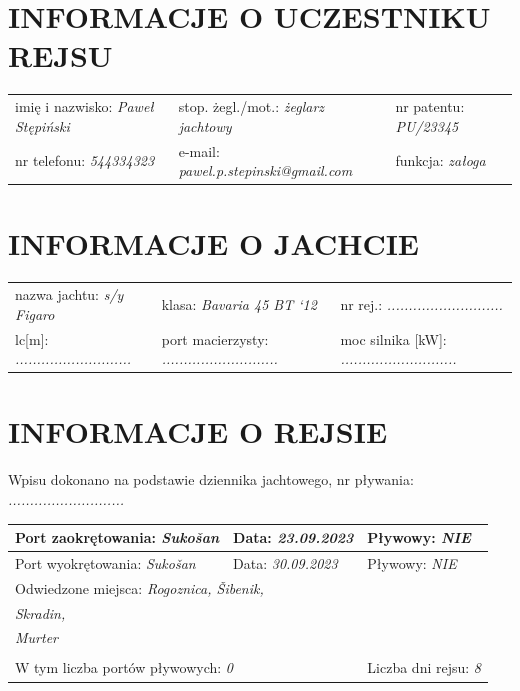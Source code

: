 \documentclass{article}
\begin{document}
\section*{INFORMACJE O UCZESTNIKU REJSU}
\begin{tabularx}{\textwidth}{X X X}
imię i nazwisko: \textit{Paweł Stępiński} & stop. żegl./mot.: \textit{żeglarz jachtowy} & nr patentu: \textit{PU/23345} \\
nr telefonu: \textit{544334323} & e-mail: \textit{pawel.p.stepinski@gmail.com} & funkcja: \textit{załoga} \\
\end{tabularx}

\section*{INFORMACJE O JACHCIE}

\begin{tabularx}{\textwidth}{X X X}
nazwa jachtu: \textit{s/y Figaro} & klasa: \textit{Bavaria 45 BT ‘12} & nr rej.: \textit{...........................} \\
lc[m]: \textit{...........................} & port macierzysty: \textit{...........................} & moc silnika [kW]: \textit{...........................} \\
\end{tabularx}

\section*{INFORMACJE O REJSIE}

Wpisu dokonano na podstawie dziennika jachtowego, nr pływania: \textit{...........................}
\\

\begin{tabularx}{\textwidth}{|X|X|X|}
\hline
Port zaokrętowania: \textit{Sukošan} & Data: \textit{23.09.2023} & Pływowy: \textit{NIE} \\
\hline
Port wyokrętowania: \textit{Sukošan} & Data: \textit{30.09.2023} & Pływowy: \textit{NIE} \\
\hline
\multicolumn{3}{|l|}{Odwiedzone miejsca:
\textit{Rogoznica, Šibenik,}\dotfill}\\
\multicolumn{3}{|l|}{\textit{ Skradin,}\dotfill} \\
\multicolumn{3}{|l|}{\textit{ Murter}\dotfill} \\
\multicolumn{3}{|l|}{\dotfill} \\
\hline
\multicolumn{2}{|l|}{W tym liczba portów pływowych: \textit{0}} & Liczba dni rejsu: \textit{8}\\
\hline
\end{tabularx}
\\\\
\end{document}
